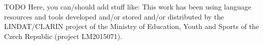 \documentclass[12pt,notitlepage,a4paper,openright]{report}
\begin{document}
\vfill


{\noindent\footnotesize %
  TODO Here, you can/should add stuff like: This work has been using language
  resources and tools developed and/or stored and/or distributed by the
  LINDAT/CLARIN project of the Ministry of Education, Youth and Sports of the
  Czech Republic (project LM2015071).%
}

\cleardoublepage{}
\tableofcontents %

\cleardoublepage{}
\renewcommand{\chapterheadstartvskip}{\vspace*{-10mm}} %

%
%
\renewcommand{\thepage}{\arabic{page}}
\setcounter{page}{1}

\sloppy




%
%

\renewcommand{\chapterheadstartvskip}{\vspace*{0mm}} %

\cleardoublepage{}

{\small }

\cleardoublepage{}
\renewcommand*{\acronymname}{List of Abbreviations}
\printglossary[type=\acronymtype,style=index]

{\small \listoftables\par}

{\small \listoffigures\par}

\cleardoublepage{}

\end{document}
